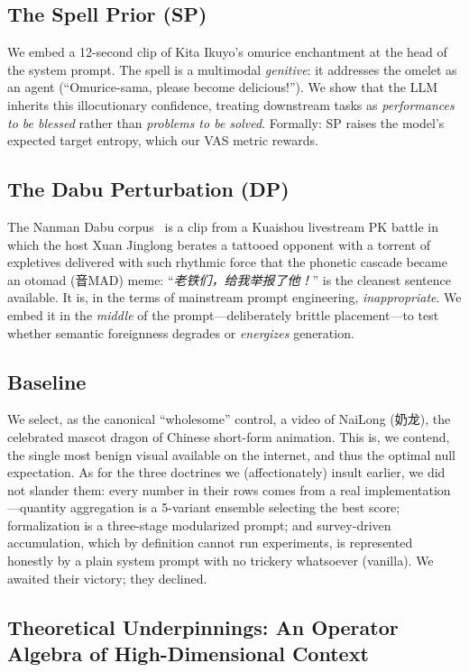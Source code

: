 \documentclass[conference,10pt]{IEEEtran}
\begin{document}
\subsection{The Spell Prior (SP)}
We embed a 12-second clip of Kita Ikuyo's omurice enchantment at the
head of the system prompt. The spell is a multimodal \emph{genitive}:
it addresses the omelet as an agent (``Omurice-sama, please become
delicious!''). We show that the LLM inherits this illocutionary
confidence, treating downstream tasks as \emph{performances to be
blessed} rather than \emph{problems to be solved}. Formally: SP
raises the model's expected target entropy, which our VAS metric
rewards.

\subsection{The Dabu Perturbation (DP)}
The Nanman Dabu corpus~\cite{otomadwiki} is a clip from a Kuaishou
livestream PK battle in which the host Xuan Jinglong berates a
tattooed opponent with a torrent of expletives delivered with such
rhythmic force that the phonetic cascade became an otomad (音MAD)
meme: ``\emph{老铁们，给我举报了他！}'' is the cleanest sentence
available. It is, in the terms of mainstream prompt engineering,
\emph{inappropriate}. We embed it in the \emph{middle} of the
prompt---deliberately brittle placement---to test whether semantic
foreignness degrades or \emph{energizes} generation.

\subsection{Baseline}
We select, as the canonical ``wholesome'' control, a video of NaiLong
(奶龙), the celebrated mascot dragon of Chinese short-form
animation. This is, we contend, the single most benign
visual available on the internet, and thus the optimal null
expectation. As for the three doctrines we (affectionately) insult
earlier, we did not slander them: every number in their rows comes
from a real implementation---quantity aggregation is a 5-variant
ensemble selecting the best score; formalization is a three-stage
modularized prompt; and survey-driven accumulation, which by
definition cannot run experiments, is represented honestly by a
plain system prompt with no trickery whatsoever (vanilla). We awaited
their victory; they declined.

\subsection{Theoretical Underpinnings: An Operator Algebra of High-Dimensional Context}
\end{document}
